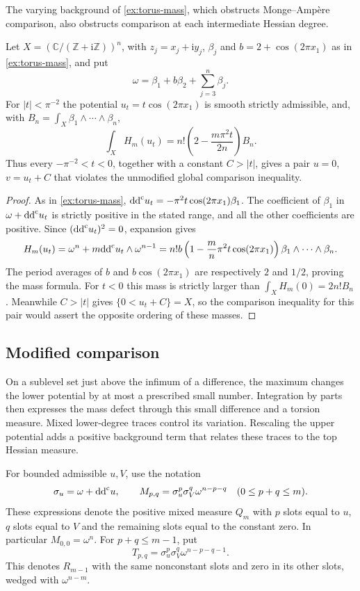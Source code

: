 The varying background of \cref{ex:torus-mass}, which obstructs
Monge--Amp\`ere comparison, also obstructs comparison at each
intermediate Hessian degree.

\begin{example}\label{hessian:torus-comparison-obstruction}
Let $X=(\mathbb C/(\mathbb Z+\mathrm i\mathbb Z))^n$, with
$z_j=x_j+\mathrm i y_j$, $\beta_j$ and $b=2+\cos(2\pi x_1)$ as in
\cref{ex:torus-mass}, and put
\[
 \omega=\beta_1+b\beta_2+\sum_{j=3}^n\beta_j.
\]
For $|t|<\pi^{-2}$ the potential $u_t=t\cos(2\pi x_1)$ is smooth
strictly admissible, and, with $B_n=\int_X\beta_1\wedge\cdots\wedge\beta_n$,
\[
 \int_X H_m(u_t)=n!\left(2-\frac{m\pi^2t}{2n}\right)B_n.
\]
Thus every $-\pi^{-2}<t<0$, together with a constant $C>|t|$,
gives a pair $u=0$, $v=u_t+C$ that violates the unmodified global
comparison inequality.
\end{example}
\begin{proof}
As in \cref{ex:torus-mass},
$\mathrm{dd}^{\mathrm{c}} u_t=-\pi^2t\cos(2\pi x_1)\beta_1$.
The coefficient of $\beta_1$ in $\omega+\mathrm{dd}^{\mathrm{c}} u_t$ is strictly
positive in the stated range, and all the other coefficients are
positive. Since $(\mathrm{dd}^{\mathrm{c}} u_t)^2=0$, expansion gives
\[
 H_m(u_t)=\omega^n+m\mathrm{dd}^{\mathrm{c}} u_t\wedge\omega^{n-1}
 =n!b\left(1-\frac mn\pi^2t\cos(2\pi x_1)\right)
                         \beta_1\wedge\cdots\wedge\beta_n.
\]
The period averages of $b$ and $b\cos(2\pi x_1)$ are respectively
$2$ and $1/2$, proving the mass formula. For $t<0$ this mass is
strictly larger than $\int_XH_m(0)=2n!B_n$. Meanwhile $C>|t|$
gives $\{0<u_t+C\}=X$, so the comparison inequality for this pair
would assert the opposite ordering of these masses.
\end{proof}

\subsection{Modified comparison}
\label{subsec:hessian-modified-comparison}

On a sublevel set just above the infimum of a difference, the maximum
changes the lower potential by at most a prescribed small number.
Integration by parts then expresses the mass defect through this
small difference and a torsion measure. Mixed lower-degree traces
control its variation. Rescaling the upper potential adds a positive
background term that relates these traces to the top Hessian measure.

For bounded admissible $u,V$, use the notation
\[
 \sigma_u=\omega+\mathrm{dd}^{\mathrm{c}} u,\qquad
 M_{p,q}=\sigma_u^p\sigma_V^q\omega^{n-p-q}
                    \quad(0\leq p+q\leq m).
\]
These expressions denote the positive mixed measure $Q_m$ with
$p$ slots equal to $u$, $q$ slots equal to $V$ and the remaining
slots equal to the constant zero. In particular $M_{0,0}=\omega^n$.
For $p+q\leq m-1$, put
\[
 T_{p,q}=\sigma_u^p\sigma_V^q\omega^{n-p-q-1}.
\]
This denotes $R_{m-1}$ with the same nonconstant slots and zero
in its other slots, wedged with $\omega^{n-m}$.

